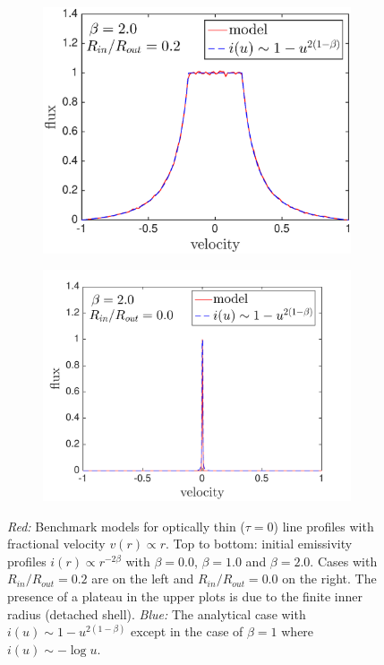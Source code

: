 \begin{figure}
\begin{subfigure}{0.5\textwidth}
\centering
\includegraphics[trim =0 0 45 15,clip=true,scale=0.4]{chapters/chapter4/images/params/A/b2_r0_2}
\end{subfigure}
\hspace{4mm}
\begin{subfigure}{0.5\textwidth}
\centering
\includegraphics[trim =72 0 45 15,clip=true,scale=0.4]{chapters/chapter4/images/params/A/b2_r0.pdf}
\end{subfigure}

\caption{\textit{Red:} Benchmark models for optically thin ($\tau =0$) 
line profiles  with fractional velocity $v(r) \propto r$. Top to bottom: initial emissivity 
profiles $i(r) \propto r^{-2\beta}$ with $\beta=0.0$, $\beta=1.0$ and 
$\beta=2.0$. Cases with $R_{in}/R_{out}=0.2$ are on the left and 
$R_{in}/R_{out}=0.0$ on the right.  The presence of a plateau in the upper plots is due to the finite inner radius (detached shell). \textit{Blue:} The analytical case 
with $i(u) \sim 1-u^{2(1-\beta)}$ except in the case of $\beta=1$ where 
$i(u) \sim -\log u$.}
\label{fig:analytics}
\end{figure}



